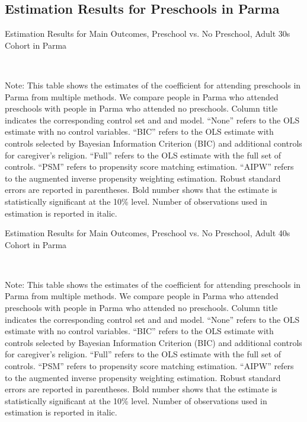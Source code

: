 \subsection{Estimation Results for Preschools in Parma}




\begin{table}[H] \caption{Estimation Results for Main Outcomes, Preschool vs. No Preschool, Adult 30s Cohort in Parma} \label{ols-M-adult30-reg-pres-parma}
\scalebox{0.7}{}
\vspace{1ex} \\
\footnotesize\raggedright{Note: This table shows the estimates of the coefficient for attending preschools in Parma from multiple methods. We compare people in Parma who attended preschools with people in Parma who attended no preschools. Column title indicates the corresponding control set and and model. ``None'' refers to the OLS estimate with no control variables. ``BIC'' refers to the OLS estimate with controls selected by Bayesian Information Criterion (BIC) and additional controls for caregiver's religion. ``Full'' refers to the OLS estimate with the full set of controls. ``PSM'' refers to propensity score matching estimation. ``AIPW'' refers to the augmented inverse propensity weighting estimation. Robust standard errors are reported in parentheses. Bold number shows that the estimate is statistically significant at the 10\% level. Number of observations used in estimation is reported in italic.}

\end{table}




\begin{table}[H] \caption{Estimation Results for Main Outcomes, Preschool vs. No Preschool, Adult 40s Cohort in Parma} \label{ols-M-adult40-reg-pres-parma}
\scalebox{0.7}{}
\vspace{1ex} \\
\footnotesize\raggedright{Note: This table shows the estimates of the coefficient for attending preschools in Parma from multiple methods. We compare people in Parma who attended preschools with people in Parma who attended no preschools. Column title indicates the corresponding control set and and model. ``None'' refers to the OLS estimate with no control variables. ``BIC'' refers to the OLS estimate with controls selected by Bayesian Information Criterion (BIC) and additional controls for caregiver's religion. ``Full'' refers to the OLS estimate with the full set of controls. ``PSM'' refers to propensity score matching estimation. ``AIPW'' refers to the augmented inverse propensity weighting estimation. Robust standard errors are reported in parentheses. Bold number shows that the estimate is statistically significant at the 10\% level. Number of observations used in estimation is reported in italic.}

\end{table}




